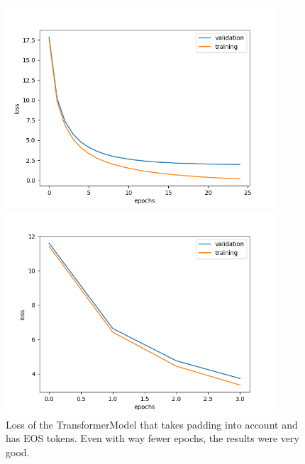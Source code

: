 \documentclass{article}
\begin{document}
\begin{figure}[h]
    \centering
    \begin{minipage}{0.45\textwidth}
        \captionsetup{width=0.8\textwidth}
        \includegraphics[width=0.9\textwidth]{transformer.png}
        \caption{%
            Loss of the standard TransformerModel
        }\label{fig:transformerLossNoPadding}
    \end{minipage}
    \begin{minipage}{0.45\textwidth}
        \captionsetup{width=0.8\textwidth}
        \includegraphics[width=0.9\textwidth]{transformer_padding-eos.png}
        \caption{%
            Loss of the TransformerModel that takes padding into account and has
            EOS tokens. Even with way fewer epochs, the results were very good.
        }\label{fig:transformerLossPaddingEOS}
    \end{minipage}
\end{figure}
\end{document}
